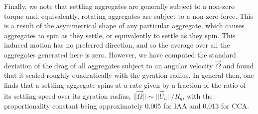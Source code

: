Finally, we note that settling aggregates are generally subject to a non-zero torque and, 
equivalently, rotating aggregates are subject to a non-zero force. 
This is a result of the asymmetrical shape of any particular aggregate, which causes aggregates to spin as they settle, or equivalently to settle as they spin. This induced motion has no preferred direction, and so the average over all the aggregates generated here is zero. However, we have computed the standard deviation of the drag of all aggregates subject to an angular velocity $\vec{\Omega}$ and found that it scaled roughly quadratically with the gyration radius. In general then, one finds that a settling aggregate spins at a rate given by a fraction of the ratio of its settling speed over its gyration radius, $||\vec{\Omega}|| \sim ||\vec{U}_a||/R_g$, with the proportionality constant being approximately 0.005 for IAA and 0.013 for CCA.




